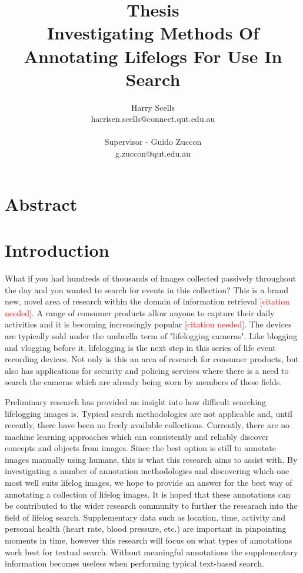 \documentclass[12pt,a4paper]{article}
\newcommand\todo[1]{\textcolor{red}{#1}}
\begin{document}
\title{\small Thesis\\\huge Investigating Methods Of Annotating Lifelogs For Use In Search}

\author{Harry Scells\\harrisen.scells@connect.qut.edu.au\\\\\small Supervisor - Guido Zuccon\\\small g.zuccon@qut.edu.au\\}
\maketitle
\pagebreak
\tableofcontents
\pagebreak

\section{Abstract}

\section{Introduction}

What if you had hundreds of thousands of images collected passively throughout the day and you wanted to search for events in this collection? This is a brand new, novel area of research within the domain of information retrieval \todo{[citation needed]}. A range of consumer products allow anyone to capture their daily activities and it is becoming increasingly popular \todo{[citation needed]}. The devices are typically sold under the umbrella term of "lifelogging cameras". Like blogging and vlogging before it, lifelogging is the next step in this series of life event recording devices. Not only is this an area of research for consumer products, but also has applications for security and policing services where there is a need to search the cameras which are already being worn by members of these fields.

Preliminary research has provided an insight into how difficult searching lifelogging images is. Typical search methodologies are not applicable and, until recently, there have been no freely available collections. Currently, there are no machine learning approaches which can consistently and reliably discover concepts and objects from images. Since the best option is still to annotate images manually using humans, this is what this research aims to assist with. By investigating a number of annotation methodologies and discovering which one most well suits lifelog images, we hope to provide an answer for the best way of annotating a collection of lifelog images. It is hoped that these annotations can be contributed to the wider research community to further the researach into the field of lifelog search. Supplementary data such as location, time, activity and personal health (heart rate, blood pressure, etc.) are important in pinpointing moments in time, however this research will focus on what types of annotations work best for textual search. Without meaningful annotations the supplementary information becomes useless when performing typical text-based search.
\end{document}
